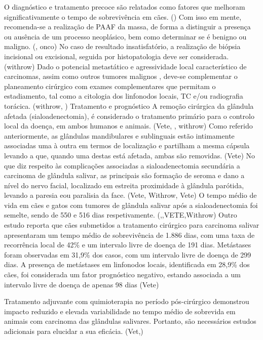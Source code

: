 O diagnóstico e tratamento precoce são relatados como fatores que melhoram significativamente o tempo de sobrevivência em cães. (\cite{Dobson2011}) Com isso em mente, recomenda-se a realização de PAAF da massa, de forma a distinguir a presença ou ausência de um processo neoplásico, bem como determinar se é benigno ou maligno. (\cite{Dobson2011}, onco) No caso de resultado insatisfatório, a realização de biópsia incisional ou excisional, seguida por histopatologia deve ser considerada. (withrow) Dado o potencial metastático e agressividade local característico de carcinomas, assim como outros tumores malignos , deve-se complementar o planeamento cirúrgico com exames complementares que permitam o estadiamento, tal como a citologia dos linfonodos locais, TC e/ou radiografia torácica. (withrow, \cite{Dobson2011})
Tratamento e prognóstico
A remoção cirúrgica da glândula afetada (sialoadenectomia), é considerado o tratamento primário para o controlo local da doença, em ambos humanos e animais. (Vete, \cite{Dobson2011}, withrow) Como referido anteriormente, as glândulas mandibulares e sublinguais estão intimamente associadas uma à outra em termos de localização e partilham a mesma cápsula levando a que, quando uma destas está afetada, ambas são removidas. (Vete) 
No que diz respeito às complicações associadas a sialoadenectomia secundária a carcinoma de glândula salivar, as principais são formação de seroma e dano a nível do nervo facial, localizado em estreita proximidade à glândula parótida, levando a paresia eou paralisia da face. (Vete, Withrow, Vete)
O tempo médio de vida em cães e gatos com tumores de glândula salivar após a sialoadenectomia foi semel\cite{Han2016}te, sendo de 550 e 516 dias respetivamente.  (\cite{tsobrev},\cite{Dobson2011},VETE,Withrow) Outro estudo reporta que cães submetidos a tratamento cirúrgico para carcinoma salivar apresentaram um tempo médio de sobrevivência de 1.886 dias, com uma taxa de recorrência local de 42\% e um intervalo livre de doença de 191 dias. Metástases foram observadas em 31,9\% dos casos, com um intervalo livre de doença de 299 dias. A presença de metástases em linfonodos locais, identificada em 28,9\% dos cães, foi considerada um fator prognóstico negativo, estando associada a um intervalo livre de doença de apenas 98 dias (Vete)


Tratamento adjuvante com quimioterapia no período pós-cirúrgico demonstrou impacto reduzido e elevada variabilidade no tempo médio de sobrevida em animais com carcinoma das glândulas salivares. Portanto, são necessários estudos adicionais para elucidar a sua eficácia. (Vet,\cite{tsobrev})

